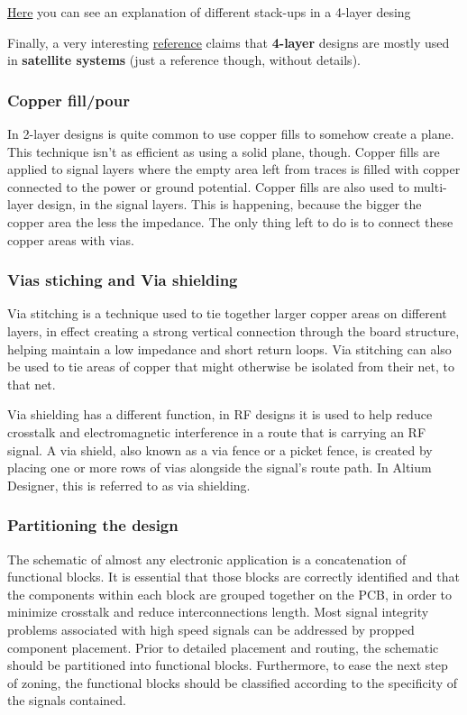 \documentclass[final]{cubedoc}
\begin{document}
	\href{http://www.hottconsultants.com/techtips/pcb-stack-up-2.html}{Here} you can see an explanation of different stack-ups in a 4-layer desing
	
	Finally, a very interesting \href{https://www.pcbcart.com/article/content/factors-determining-PCB-layers.html}{reference} claims that \textbf{4-layer} designs are mostly used in \textbf{satellite systems} (just a reference though, without details).
	
	\subsubsection{Copper fill/pour}
	In 2-layer designs is quite common to use copper fills to somehow create a plane. This technique isn't as efficient as using a solid plane, though. Copper fills are applied to signal layers where the empty area left from traces is filled with copper connected to the power or ground potential.
	Copper fills are also used to multi-layer design, in the signal layers. This is happening, because the bigger the copper area the less the impedance. The only thing left to do is to connect these copper areas with vias.
	
	\subsubsection{Vias stiching and Via shielding}
	Via stitching is a technique used to tie together larger copper areas on different layers, in effect creating a strong vertical connection through the board structure, helping maintain a low impedance and short return loops. Via stitching can also be used to tie areas of copper that might otherwise be isolated from their net, to that net.
	
	Via shielding has a different function, in RF designs it is used to help reduce crosstalk and electromagnetic interference in a route that is carrying an RF signal.  A via shield, also known as a via fence or a picket fence, is created by placing one or more rows of vias alongside the signal's route path. In Altium Designer, this is referred to as via shielding.
	\subsubsection{Partitioning the design}
	The schematic of almost any electronic application is a concatenation of functional blocks. It is essential that those blocks are correctly identified and that the components within each block are grouped together on the PCB, in order to minimize crosstalk and reduce interconnections length. Most signal integrity problems associated with high speed signals can be addressed by propped component placement. Prior to detailed placement and routing, the schematic should be partitioned into functional blocks. Furthermore, to ease the next step of zoning, the functional blocks should be classified according to the specificity of the signals contained.
	
\end{document}
